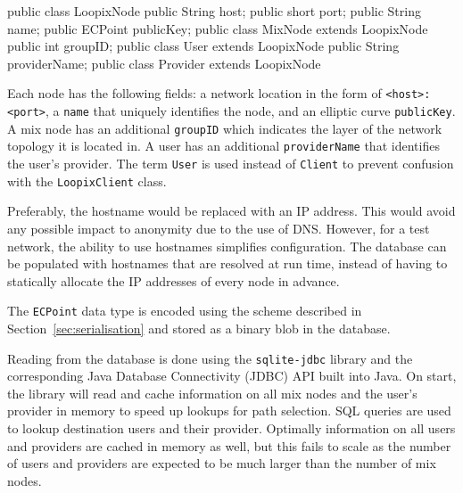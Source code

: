 \documentclass[final,dissertation.tex]{subfiles}
\begin{document}
\begin{javacode}
public class LoopixNode {
    public String host;
    public short port;
    public String name;
    public ECPoint publicKey;
}
public class MixNode extends LoopixNode {
	public int groupID;
}
public class User extends LoopixNode {
    public String providerName;
}
public class Provider extends LoopixNode { }
\end{javacode}

Each node has the following fields: a network location in the form of \verb|<host>:<port>|, a \verb|name| that uniquely identifies the node, and an elliptic curve \verb|publicKey|. A mix node has an additional \verb|groupID| which indicates the layer of the network topology it is located in. A user has an additional \verb|providerName| that identifies the user's provider. The term \verb|User| is used instead of \verb|Client| to prevent confusion with the \verb|LoopixClient| class.

Preferably, the hostname would be replaced with an IP address. This would avoid any possible impact to anonymity due to the use of DNS. However, for a test network, the ability to use hostnames simplifies configuration. The database can be populated with hostnames that are resolved at run time, instead of having to statically allocate the IP addresses of every node in advance.


The \verb|ECPoint| data type is encoded using the scheme described in Section~\ref{sec:serialisation} and stored as a binary blob in the database.

Reading from the database is done using the \verb|sqlite-jdbc| library and the corresponding Java Database Connectivity (JDBC)
API built into Java. On start, the library will read and cache information on all mix nodes and the user's provider in memory to speed up lookups for path selection. SQL queries are used to lookup destination users and their provider. Optimally information on all users and providers are cached in memory as well, but this fails to scale as the number of users and providers are expected to be much larger than the number of mix nodes.
\end{document}
